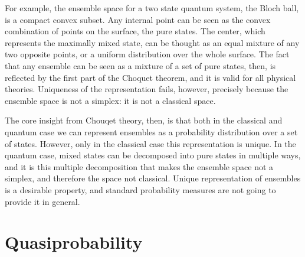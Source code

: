 \documentclass[10pt,twocolumn, nofootinbib]{revtex4-2}
\begin{document}
For example, the ensemble space for a two state quantum system, the Bloch ball, is a compact convex subset. Any internal point can be seen as the convex combination of points on the surface, the pure states. The center, which represents the maximally mixed state, can be thought as an equal mixture of any two opposite points, or a uniform distribution over the whole surface. The fact that any ensemble can be seen as a mixture of a set of pure states, then, is reflected by the first part of the Choquet theorem, and it is valid for all physical theories. Uniqueness of the representation fails, however, precisely because the ensemble space is not a simplex: it is not a classical space.

The core insight from Chouqet theory, then, is that both in the classical and quantum case we can represent ensembles as a probability distribution over a set of states. However, only in the classical case this representation is unique. In the quantum case, mixed states can be decomposed into pure states in multiple ways, and it is this multiple decomposition that makes the ensemble space not a simplex, and therefore the space not classical. Unique representation of ensembles is a desirable property, and standard probability measures are not going to provide it in general.

\section{Quasiprobability}




\end{document}
